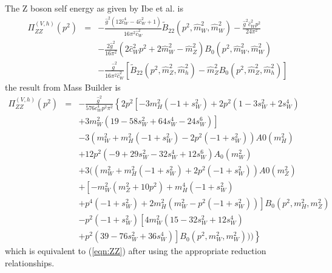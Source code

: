 \documentclass[11pt]{article}
\newcommand{\mb}{\textsf{Mass Builder} \! }
\begin{document}
The Z boson self energy as given by Ibe et al. is
{
\begin{eqnarray}
\Pi_{ZZ}^{(V,h)}(p^2) &=& 
-\frac{ \hat{g}^2 (12\hat{c}_W^4 - 4\hat{c}_W^2 + 1) }{16\pi^2 \hat{c}_W^2}
\tilde B_{22}(p^2, \hat{m}_W^2, \hat{m}_W^2) 
-\frac{ \hat{g}^2 \hat{c}_W^2 p^2 }{24\pi^2} \nonumber \\
&& -\frac{2\hat{g}^2}{16\pi^2}(2\hat{c}_W^2 p^2 + 2\hat{m}_W^2 - \hat{m}_Z^2)
B_0(p^2, \hat{m}_W^2, \hat{m}_W^2) \nonumber \\
&& -\frac{ \hat{g}^2 }{16\pi^2 \hat{c}_W^2}
[\tilde B_{22}(p^2, \hat{m}_Z^2, \hat{m}_h^2)\label{eqn:ZZ}
-\hat{m}_Z^2 B_0(p^2, \hat{m}_Z^2, \hat{m}_h^2) ]
\end{eqnarray}
}
the result from \mb is
{
\begin{eqnarray}
\Pi_{ZZ}^{(V,h)}(p^2) &=& 
-\frac{ \hat{g}^2} {576 c_W^4 p^2 \pi^2}\left\{
2 p^2 \left[-3 m_H^2 (-1 + s_W^2) + 2 p^2 (1 - 3 s_W^2 + 2 s_W^4) \right. \right.\nonumber\\
&& \left.+ 3 m_W^2 (19 - 58 s_W^2 + 64 s_W^4 - 24 s_W^6)\right] \nonumber\\
&&- 3 (m_W^2 + m_H^2 (-1 + s_W^2) - 2 p^2 (-1 + s_W^2)) A0\left(m_H^2\right)  \nonumber\\
 &&  + 12 p^2 (-9 + 29 s_W^2 - 32 s_W^4 + 12 s_W^6) A_0\left(m_W^2\right)  \nonumber\\
   && +3 ((m_W^2 + m_H^2 (-1 + s_W^2) + 2 p^2 (-1 + s_W^2)) A0\left(m_Z^2\right)  \nonumber\\
   &&+ \left[-m_W^2 (m_Z^2 + 10 p^2) + m_H^4 (-1 + s_W^2)\right.  \nonumber\\
   && \left. +     p^4 (-1 + s_W^2) + 2 m_H^2 (m_W^2 - p^2 (-1 + s_W^2))\right] B_0\left(p^2, m_H^2, m_Z^2\right)  \nonumber\\
&&   -    p^2 (-1 + s_W^2) \left[4 m_W^2 (15 - 32 s_W^2 + 12 s_W^4)\right.  \nonumber\\
&&  \left.      \left. +  p^2 (39 - 76 s_W^2 + 36 s_W^4)\right] B_0\left(p^2, m_W^2, m_W^2\right)))\right\}
\end{eqnarray}
}
which is equivalent to (\ref{eqn:ZZ}) after using the appropriate reduction relationships.
\end{document}
